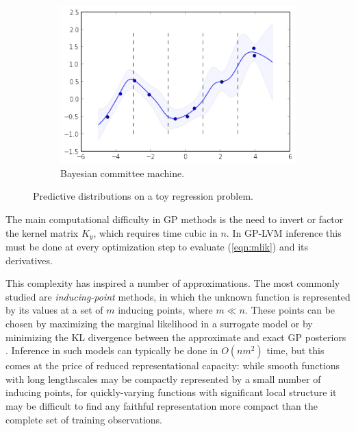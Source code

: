 \documentclass{article}
\begin{document}
\begin{figure}
\begin{subfigure}[t]{.30\textwidth}
  \includegraphics[width=\textwidth]{toy_bcm_posterior}
  \caption{Bayesian committee machine.}
  \label{fig:bcm}
\end{subfigure}
\caption{Predictive distributions on a toy regression problem.}
\label{fig:approx}
\end{figure} 


The main computational difficulty in GP methods is
the need to invert or factor the kernel matrix $K_y$, which requires time cubic
in $n$. In GP-LVM inference this must be done at every optimization step to evaluate
(\ref{eqn:mlik}) and its derivatives.

This complexity has inspired
a number of approximations. The most commonly studied are {\em inducing-point} methods, in which the unknown function is
represented by its values at a set of $m$ inducing
points, where $m \ll n$. These points can be chosen by maximizing the marginal
likelihood in a surrogate model \citep{quinonero2005, lawrence2007learning} or by
minimizing the KL divergence between the approximate and exact GP posteriors
\citep{titsias2009variational}. Inference in such models can
typically be done in $O(nm^2)$ time, but this comes at the price
of reduced representational capacity: while smooth functions with long lengthscales may
be compactly represented by a small number of inducing points, for
quickly-varying functions with significant local
structure it may be difficult to find any faithful representation more
compact than the complete set of training observations.
\end{document}
